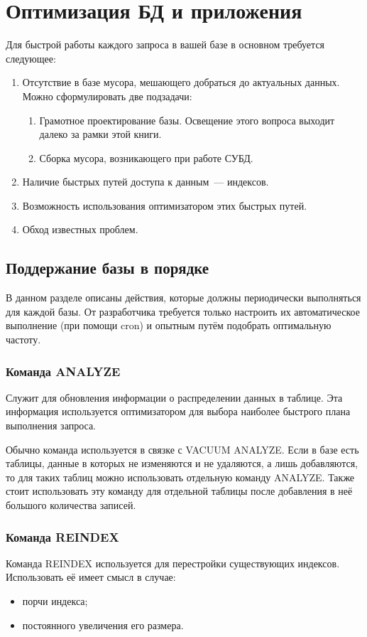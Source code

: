 \section{Оптимизация БД и приложения}
Для быстрой работы каждого запроса в вашей базе в основном требуется следующее:
\begin{enumerate}
\item Отсутствие в базе мусора, мешающего добраться до актуальных данных. Можно сформулировать две подзадачи:
\begin{enumerate}
\item Грамотное проектирование базы. Освещение этого вопроса выходит далеко за рамки этой книги.
\item Сборка мусора, возникающего при работе СУБД.
\end{enumerate}
\item Наличие быстрых путей доступа к данным~--- индексов.
\item Возможность использования оптимизатором этих быстрых путей.
\item Обход известных проблем.
\end{enumerate}

\subsection{Поддержание базы в порядке}
В данном разделе описаны действия, которые должны периодически выполняться для каждой базы. От разработчика требуется только настроить 
их автоматическое выполнение (при помощи cron) и опытным путём подобрать оптимальную частоту.

\subsubsection{Команда ANALYZE}
Служит для обновления информации о распределении данных в таблице. Эта информация используется оптимизатором для выбора наиболее 
быстрого плана выполнения запроса.

Обычно команда используется в связке с VACUUM ANALYZE. Если в базе есть таблицы, данные в которых не изменяются и не удаляются, а лишь 
добавляются, то для таких таблиц можно использовать отдельную команду ANALYZE. Также стоит использовать эту команду для отдельной 
таблицы после добавления в неё большого количества записей.

\subsubsection{Команда REINDEX}
Команда REINDEX используется для перестройки существующих индексов.
Использовать её имеет смысл в случае:
\begin{itemize}
\item порчи индекса;
\item постоянного увеличения его размера.
\end{itemize}

